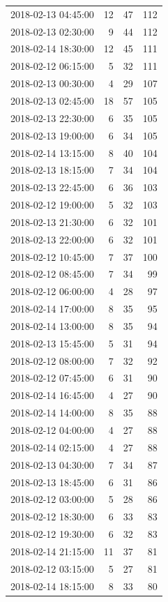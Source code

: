\begin{tabular}{lrrr}
2018-02-13 04:45:00 & 12 & 47 & 112 \\
2018-02-13 02:30:00 & 9 & 44 & 112 \\
2018-02-14 18:30:00 & 12 & 45 & 111 \\
2018-02-12 06:15:00 & 5 & 32 & 111 \\
2018-02-13 00:30:00 & 4 & 29 & 107 \\
2018-02-13 02:45:00 & 18 & 57 & 105 \\
2018-02-13 22:30:00 & 6 & 35 & 105 \\
2018-02-13 19:00:00 & 6 & 34 & 105 \\
2018-02-14 13:15:00 & 8 & 40 & 104 \\
2018-02-13 18:15:00 & 7 & 34 & 104 \\
2018-02-13 22:45:00 & 6 & 36 & 103 \\
2018-02-12 19:00:00 & 5 & 32 & 103 \\
2018-02-13 21:30:00 & 6 & 32 & 101 \\
2018-02-13 22:00:00 & 6 & 32 & 101 \\
2018-02-12 10:45:00 & 7 & 37 & 100 \\
2018-02-12 08:45:00 & 7 & 34 & 99 \\
2018-02-12 06:00:00 & 4 & 28 & 97 \\
2018-02-14 17:00:00 & 8 & 35 & 95 \\
2018-02-14 13:00:00 & 8 & 35 & 94 \\
2018-02-13 15:45:00 & 5 & 31 & 94 \\
2018-02-12 08:00:00 & 7 & 32 & 92 \\
2018-02-12 07:45:00 & 6 & 31 & 90 \\
2018-02-14 16:45:00 & 4 & 27 & 90 \\
2018-02-14 14:00:00 & 8 & 35 & 88 \\
2018-02-12 04:00:00 & 4 & 27 & 88 \\
2018-02-14 02:15:00 & 4 & 27 & 88 \\
2018-02-13 04:30:00 & 7 & 34 & 87 \\
2018-02-13 18:45:00 & 6 & 31 & 86 \\
2018-02-12 03:00:00 & 5 & 28 & 86 \\
2018-02-12 18:30:00 & 6 & 33 & 83 \\
2018-02-12 19:30:00 & 6 & 32 & 83 \\
2018-02-14 21:15:00 & 11 & 37 & 81 \\
2018-02-12 03:15:00 & 5 & 27 & 81 \\
2018-02-14 18:15:00 & 8 & 33 & 80 \\

\end{tabular}
